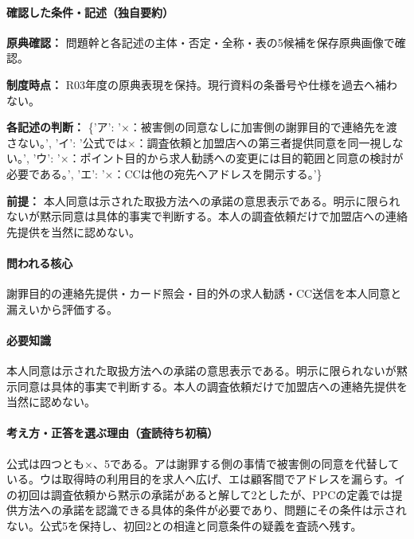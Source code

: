 \paragraph{確認した条件・記述（独自要約）}\mbox{}\par

\noindent\textbf{原典確認：} 問題幹と各記述の主体・否定・全称・表の5候補を保存原典画像で確認。\par

\noindent\textbf{制度時点：} R03年度の原典表現を保持。現行資料の条番号や仕様を過去へ補わない。\par

\noindent\textbf{各記述の判断：} \{'ア': '×：被害側の同意なしに加害側の謝罪目的で連絡先を渡さない。', 'イ': '公式では×：調査依頼と加盟店への第三者提供同意を同一視しない。', 'ウ': '×：ポイント目的から求人勧誘への変更には目的範囲と同意の検討が必要である。', 'エ': '×：CCは他の宛先へアドレスを開示する。'\}\par

\noindent\textbf{前提：} 本人同意は示された取扱方法への承諾の意思表示である。明示に限られないが黙示同意は具体的事実で判断する。本人の調査依頼だけで加盟店への連絡先提供を当然に認めない。\par

\paragraph{問われる核心} 謝罪目的の連絡先提供・カード照会・目的外の求人勧誘・CC送信を本人同意と漏えいから評価する。

\paragraph{必要知識} 本人同意は示された取扱方法への承諾の意思表示である。明示に限られないが黙示同意は具体的事実で判断する。本人の調査依頼だけで加盟店への連絡先提供を当然に認めない。

\paragraph{考え方・正答を選ぶ理由（査読待ち初稿）} 公式は四つとも×、5である。アは謝罪する側の事情で被害側の同意を代替している。ウは取得時の利用目的を求人へ広げ、エは顧客間でアドレスを漏らす。イの初回は調査依頼から黙示の承諾があると解して2としたが、PPCの定義では提供方法への承諾を認識できる具体的条件が必要であり、問題にその条件は示されない。公式5を保持し、初回2との相違と同意条件の疑義を査読へ残す。

